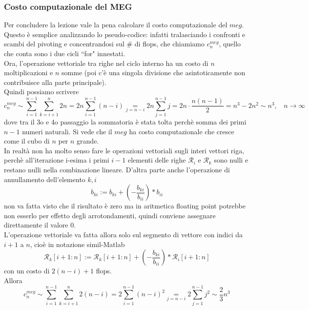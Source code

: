 \documentclass[12pt,a4paper]{article}
\begin{document}
\subsubsection{Costo computazionale del MEG}
Per concludere la lezione vale la pena calcolare il costo computazionale del $meg$.\\Questo è semplice analizzando lo pseudo-codice: infatti tralasciando i confronti e scambi del pivoting e concentrandosi sul \# di flops, che chiamiamo $c_n^{meg}$, quello che conta sono i due cicli ``for" innestati.\\Ora, l'operazione vettoriale tra righe nel ciclo interno ha un costo di $n$ moltiplicazioni e $n$ somme (poi c'è una singola divisione che asintoticamente non contribuisce alla parte principale).\\Quindi possiamo scrivere
\begin{equation*}
    c_n^{meg}\sim\sum_{i=1}^{n-1}\sum_{k=i+1}^{n}2n=2n\sum_{i=1}^{n-1}(n-i)\underset{j=n-i}{=}2n\sum_{j=1}^{n-1}j=2n\cdot\frac{n(n-1)}{2}=n^3-2n^2\sim n^3,\  \  \  \  n\rightarrow\infty
\end{equation*}
dove tra il 3o e 4o passaggio la sommatoria è stata tolta perchè somma dei primi $n-1$ numeri naturali. Si vede che il $meg$ ha costo computazionale che cresce come il cubo di $n$ per $n$ grande.\\In realtà non ha molto senso fare le operazioni vettoriali sugli interi vettori riga, perchè all'iterazione i-esima i primi $i-1$ elementi delle righe $\mathcal{R}_i$ e $\mathcal{R}_k$ sono nulli e restano nulli nella combinazione lineare. D'altra parte anche l'operazione di annullamento dell'elemento $k,i$
\begin{equation*}
    b_{ki}:=b_{ki}+(-\frac{b_{ki}}{b_{ii}})\ast b_{ii}
\end{equation*}
non va fatta visto che il risultato è zero ma in aritmetica floating point potrebbe non esserlo per effetto degli arrotondamenti, quindi conviene assegnare direttamente il valore 0.\\L'operazione vettoriale va fatta allora solo sul segmento di vettore con indici da $i+1$ a $n$, cioè in notazione simil-Matlab
\begin{equation*}
    \mathcal{R}_k[i+1:n]:=\mathcal{R}_k[i+1:n]+(-\frac{b_{ki}}{b_{ii}})\ast \mathcal{R}_i[i+1:n]
\end{equation*}
con un costo di $2(n-i)+1$ flops.\\Allora
\begin{equation*}
    c_n^{meg}\sim\sum_{i=1}^{n-1}\sum_{k=i+1}^{n}2(n-i)=2\sum_{i=1}^{n-1}(n-i)^2\underset{j=n-i}{=}2\sum_{j=1}^{n-1}j^2\sim \frac{2}{3}n^3
\end{equation*}
\end{document}
